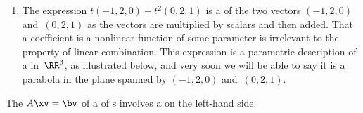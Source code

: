 \begin{example}
\begin{enumerate}
\item 
The expression \(t(-1,2,0)+t^2(0,2,1)\)
is a  of the two vectors \((-1,2,0)\) 
and~\((0,2,1)\) as the vectors are multiplied by scalars and then added.  
That a coefficient is a nonlinear function of some parameter is irrelevant to the property of linear combination.
This expression is a parametric description of a  in~\(\RR^3\), as illustrated below, and very soon we will be able to say it is a parabola in the plane spanned by \((-1,2,0)\) and~\((0,2,1)\).
\begin{center}
 {}
\end{center}

\end{enumerate}
\end{example}



The  \(A\xv=\bv\) of a  of s involves a  on the left-hand side.

